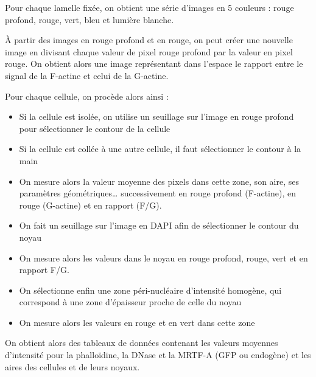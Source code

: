 \documentclass{report}
\begin{document}
	Pour chaque lamelle fixée, on obtient une série d'images en 5 couleurs : rouge profond, rouge, vert, bleu et lumière blanche. 

À partir des images en rouge profond et en rouge, on peut créer une nouvelle image en divisant chaque valeur de pixel rouge profond par la valeur en pixel rouge. On obtient alors une image représentant dans l'espace le rapport entre le signal de la F-actine et celui de la G-actine.

Pour chaque cellule, on procède alors ainsi : 
\begin{itemize}
\item Si la cellule est isolée, on utilise un seuillage sur l'image en rouge profond pour sélectionner le contour de la cellule
\item Si la cellule est collée à une autre cellule, il faut sélectionner le contour à la main
\item On mesure alors la valeur moyenne des pixels dans cette zone, son aire, ses paramètres géométriques\dots
successivement en rouge profond (F-actine), en rouge (G-actine) et en rapport (F/G). 
\item On fait un seuillage sur l'image en DAPI afin de sélectionner le contour du noyau
\item On mesure alors les valeurs dans le noyau en rouge profond, rouge, vert et en rapport F/G. 
\item On sélectionne enfin une zone péri-nucléaire d'intensité homogène, qui correspond à une zone d'épaisseur proche de celle du noyau
\item On mesure alors les valeurs en rouge et en vert dans cette zone
\end{itemize}	
	
	On obtient alors des tableaux de données contenant les valeurs moyennes d'intensité pour la phalloïdine, la DNase et la MRTF-A (GFP ou endogène) et les aires des cellules et de leurs noyaux. 
	
	
\end{document}
